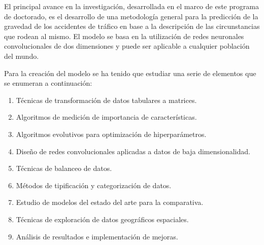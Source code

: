 El principal avance en la investigación, desarrollada en el marco de este programa de doctorado, es el desarrollo de una metodología general  para la predicción de la gravedad de los accidentes de tráfico en base a la descripción de las circunstancias que rodean al mismo. El modelo se basa en la utilización de redes neuronales convolucionales de dos dimensiones y puede ser aplicable a cualquier población del mundo.



Para la creación del modelo se ha tenido que estudiar una serie de elementos que se enumeran a continuación:

\begin{enumerate}
	\item Técnicas de transformación de datos tabulares a matrices.
	\item Algoritmos de medición de importancia de características. 
	\item Algoritmos evolutivos para optimización de hiperparámetros.
	\item Diseño de redes convolucionales aplicadas a datos de baja dimensionalidad.
	\item Técnicas de balanceo de datos.
	\item Métodos de tipificación y categorización de datos.
	\item Estudio de modelos del estado del arte para la comparativa. 
	\item Técnicas de exploración de datos geográficos espaciales.
	\item Análisis de resultados e implementación de mejoras.
\end{enumerate}


